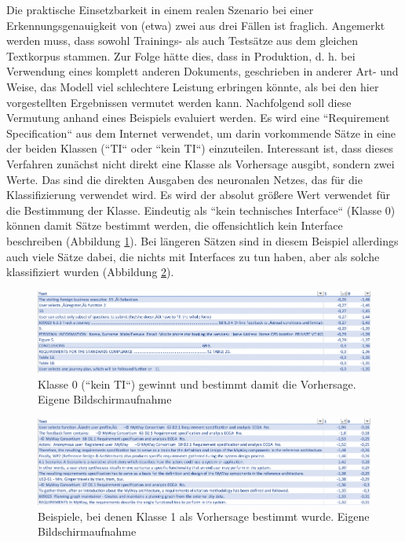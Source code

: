 Die praktische Einsetzbarkeit in einem realen Szenario bei einer Erkennungsgenauigkeit von (etwa) zwei aus drei Fällen ist fraglich. Angemerkt werden muss, dass sowohl Trainings- als auch Testsätze aus dem gleichen Textkorpus stammen. Zur Folge hätte dies, dass in Produktion, d. h. bei Verwendung eines komplett anderen Dokuments, geschrieben in anderer Art- und Weise, das Modell viel schlechtere Leistung erbringen könnte, als bei den hier vorgestellten Ergebnissen vermutet werden kann. Nachfolgend soll diese Vermutung anhand eines Beispiels evaluiert werden. Es wird eine ``Requirement Specification`` aus dem Internet verwendet, um darin vorkommende Sätze in eine der beiden Klassen (``TI`` oder ``kein TI``) einzuteilen. Interessant ist, dass dieses Verfahren zunächst nicht direkt eine Klasse als Vorhersage ausgibt, sondern zwei Werte. Das sind die direkten Ausgaben des neuronalen Netzes, das für die Klassifizierung verwendet wird. Es wird der absolut größere Wert verwendet für die Bestimmung der Klasse. Eindeutig als ``kein technisches Interface`` (Klasse 0) können damit Sätze bestimmt werden, die offensichtlich kein Interface beschreiben (Abbildung \ref{Abbildung:bert-0}). Bei längeren Sätzen sind in diesem Beispiel allerdings auch viele Sätze dabei, die nichts mit Interfaces zu tun haben, aber als solche klassifiziert wurden (Abbildung \ref{Abbildung:bert-1}).

\begin{figure}[h]
\centering
\includegraphics[scale=0.95]{content/pics/Picture_25.png}
\caption{Klasse 0 (``kein TI``) gewinnt und bestimmt damit die Vorhersage. Eigene Bildschirmaufnahme}
\label{Abbildung:bert-0}
\end{figure}

\begin{figure}[h]
\centering
\includegraphics[scale=0.95]{content/pics/Picture_26.png}
\caption{Beispiele, bei denen Klasse 1 als Vorhersage bestimmt wurde. Eigene Bildschirmaufnahme}
\label{Abbildung:bert-1}
\end{figure}

